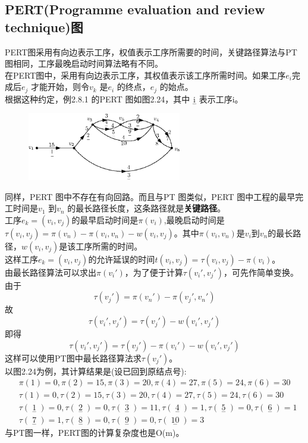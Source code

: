 \documentclass[11pt,a4paper,openany]{book}
\begin{document}
\subsection{PERT(Programme evaluation and review technique)图}
\indent PERT图采用有向边表示工序，权值表示工序所需要的时间，关键路径算法与PT图相同，工序最晚启动时间算法略有不同。\\
\indent 在PERT图中，采用有向边表示工序，其权值表示该工序所需时间。如果工序$e_i$完成后$e_j$ 才能开始，则令$v_k$ 是$e_i$ 的终点，$e_j$ 的始点。\\
根据这种约定，例2.8.1 的PERT 图如图2.24，其中$\mathop{i}\limits_{-} $表示工序i。
\begin{figure}[H]
  \centering
  \includegraphics[width=0.6\textwidth]{2_24.eps}\\
  \caption{}
\end{figure}
 同样，PERT 图中不存在有向回路。而且与PT 图类似，PERT 图中工程的最早完工时间是$v_1$ 到$v_n$ 的最长路径长度，这条路径就是\textbf{关键路径}。\\
工序$e_k=(v_i,v_j)$的最早启动时间是$\pi(v_i)$,最晚启动时间是$\tau(v_i,v_j)=\pi(v_n)-\pi(v_i,v_n)-w(v_i,v_j)$。其中$\pi(v_i,v_n)$是$v_i$到$v_n$的最长路径，$w(v_i,v_j)$是该工序所需的时间。\\
这样工序$e_k=(v_i,v_j)$的允许延误的时间$t(v_i,v_j)=\tau(v_i,v_j)-\pi(v_i)$。\\
\indent 由最长路径算法可以求出$\pi(v_i')$，为了便于计算$\tau(v_i',v_j')$，可先作简单变换。由于$$\tau(v_j')=\pi(v_n')-\pi(v_j',v_n')$$
故$$\tau(v_i',v_j')=\tau(v_j')-w(v_i',v_j')$$
即得$$\tau(v_i',v_j')=\tau(v_j')-\pi(v_i')-w(v_i',v_j')$$
这样可以使用PT图中最长路径算法求$\tau(v_j')$。\\
以图2.24为例，其计算结果是(设已回到原结点号):
\begin{align}
             &\pi(1)=0,\pi(2)=15,\pi(3)=20,\pi(4)=27,\pi(5)=24,\pi(6)=30        \\
             &\tau(1)=0, \tau(2)=15,\tau(3)=20,\tau(4)=27,\tau(5)=24,\tau(6)=30\\
             &\tau(\mathop{1}\limits_{-})=0,\tau(\mathop{2}\limits_{-})=0,\tau(\mathop{3}\limits_{-})=11,\tau(\mathop{4}\limits_{-})=1,\tau(\mathop{5}\limits_{-})=0,\tau(\mathop{6}\limits_{-})=1\\
              &  \tau(\mathop{7}\limits_{-})=1,\tau(\mathop{8}\limits_{-})=0,\tau(\mathop{9}\limits_{-})=0,\tau(\mathop{10}\limits_{-})=3
\end{align}
\indent 与PT图一样，PERT图的计算复杂度也是O(m)。\\
\end{document}
